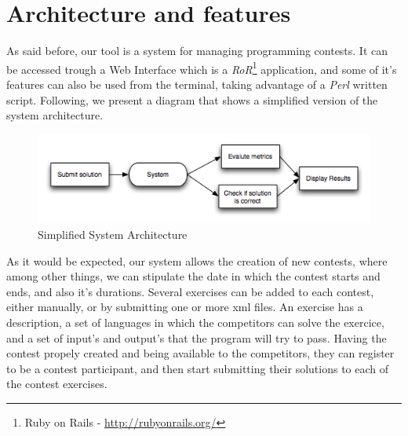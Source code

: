 \section{Architecture and features}
As said before, our tool is a system for managing programming contests. It can be accessed trough a Web Interface which is a \textit{RoR}\footnote{Ruby on Rails - \url{http://rubyonrails.org/}} application, and some of it's features can also be used from the terminal, taking advantage of a \textit{Perl} written script.
Following, we present a diagram that shows a simplified version of the system architecture.

\begin{figure}[htbp]
\includegraphics[scale=0.7]{images/arq}
\caption{Simplified System Architecture}
\label{fig:arq}
\end{figure}

As it would be expected, our system allows the creation of new contests, where among other things, we can stipulate the date in which the contest starts and ends, and also it's durations. Several exercises can be added to each contest, either manually, or by submitting one or more xml files. An exercise has a description, a set of languages in which the competitors can solve the exercice, and a set of input's and output's that the program will try to pass.
Having the contest propely created and being available to the competitors, they can register to be a contest participant, and then start submitting their solutions to each of the contest exercises.  





